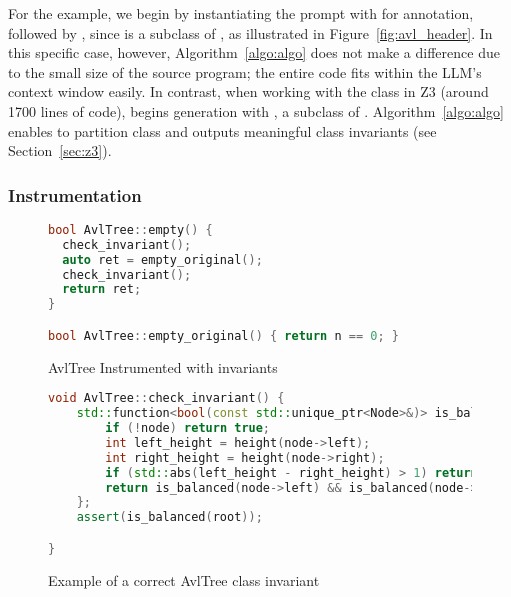 For the  example, we begin by instantiating the prompt with  for annotation, followed by , since  is a subclass of , as illustrated in Figure~\ref{fig:avl_header}. In this specific case, however, Algorithm~\ref{algo:algo} does not make a difference due to the small size of the source program; the entire  code fits within the LLM’s context window easily.
In contrast, when working with the  class in Z3 (around 1700 lines of code), \tech begins generation with , a subclass of . Algorithm~\ref{algo:algo} enables \tech to partition  class and outputs meaningful class invariants (see Section~\ref{sec:z3}).

\subsubsection{Instrumentation}
\label{sec:instrumentation}

\begin{figure}[htp]
\centering
\begin{lstlisting}[language=c++, escapechar=@]
bool AvlTree::empty() { 
  check_invariant();
  auto ret = empty_original();
  check_invariant();
  return ret;
}

bool AvlTree::empty_original() { return n == 0; }
\end{lstlisting}
    \caption{AvlTree Instrumented with invariants}
    \label{fig:avl_instrumentation}
\end{figure}

\begin{figure}[htp]
\begin{lstlisting}[language=c++, escapechar=@]
void AvlTree::check_invariant() {
    std::function<bool(const std::unique_ptr<Node>&)> is_balanced = [&](const std::unique_ptr<Node>& node) -> bool {
        if (!node) return true;
        int left_height = height(node->left);
        int right_height = height(node->right);
        if (std::abs(left_height - right_height) > 1) return false;
        return is_balanced(node->left) && is_balanced(node->right);
    };
    assert(is_balanced(root));

}
\end{lstlisting}
    \caption{Example of a correct AvlTree class invariant
    }
    \label{fig:avl_correct_inv2}
\end{figure}


